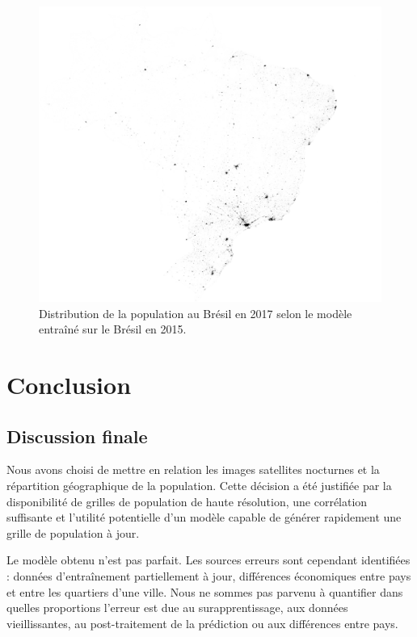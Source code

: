 \documentclass[a4paper, 11pt]{report}
\begin{document}
\begin{figure}
	\centering
	\includegraphics[width=\textwidth]{img/pred_brazil_2017.png}
	\caption{Distribution de la population au Brésil en 2017 selon le modèle entraîné sur le Brésil en 2015.}
	\label{pred_brazil_2017}
\end{figure}

\chapter{Conclusion}
\section{Discussion finale}

Nous avons choisi de mettre en relation les images satellites nocturnes et la répartition géographique de la population. Cette décision a été justifiée par la disponibilité de grilles de population de haute résolution, une corrélation suffisante et l'utilité potentielle d'un modèle capable de générer rapidement une grille de population à jour.

Le modèle obtenu n'est pas parfait. Les sources erreurs sont cependant identifiées : données d'entraînement partiellement à jour, différences économiques entre pays et entre les quartiers d'une ville. Nous ne sommes pas parvenu à quantifier dans quelles proportions l'erreur est due au surapprentissage, aux données vieillissantes, au post-traitement de la prédiction ou aux différences entre pays.
\end{document}
